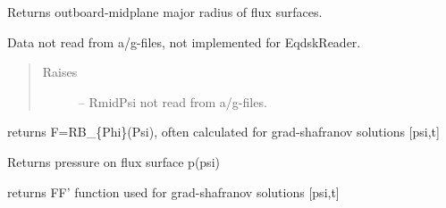 \documentclass[letterpaper,10pt,english]{sphinxmanual}
\begin{document}
\begin{fulllineitems}
\begin{fulllineitems}
\end{fulllineitems}


\begin{fulllineitems}
\label{eqtools:eqtools.eqdskreader.EqdskReader.getRmidPsi}
Returns outboard-midplane major radius of flux surfaces.

Data not read from a/g-files, not implemented for EqdskReader.
\begin{quote}\begin{description}
\item[{Raises}] \leavevmode
{} -- 
RmidPsi not read from a/g-files.

\end{description}\end{quote}

\end{fulllineitems}


\begin{fulllineitems}
\label{eqtools:eqtools.eqdskreader.EqdskReader.getF}
returns F=RB\_\{Phi\}(Psi), often calculated for grad-shafranov solutions  {[}psi,t{]}

\end{fulllineitems}


\begin{fulllineitems}
\label{eqtools:eqtools.eqdskreader.EqdskReader.getFluxPres}
Returns pressure on flux surface p(psi)

\end{fulllineitems}


\begin{fulllineitems}
\label{eqtools:eqtools.eqdskreader.EqdskReader.getFFPrime}
returns FF' function used for grad-shafranov solutions {[}psi,t{]}

\end{fulllineitems}



\end{fulllineitems}
\end{document}
